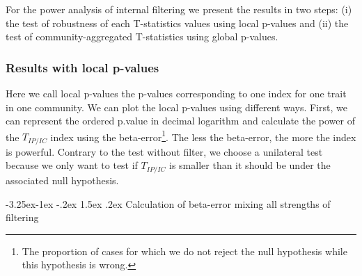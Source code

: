 \documentclass[12pt]{article}\usepackage[]{graphicx}\usepackage[]{color}
\makeatletter
\newcounter {subsubsubsection}[subsubsection]
\newcommand\subsubsubsection{\@startsection{subsubsubsection}{4}{\z@}%
          {-3.25ex\@plus -1ex \@minus -.2ex}%
          {1.5ex \@plus .2ex}%
          {\normalfont\normalsize\bfseries}}
\makeatother
\begin{document}
For the power analysis of internal filtering we present the results in two steps: (i) the test of robustness of each T-statistics values using local p-values and (ii) the test of community-aggregated T-statistics using global p-values.

 \subsubsection {Results with local p-values}

Here we call local p-values the p-values corresponding to one index for one trait in one community. We can plot the local p-values using different ways. First, we can represent the ordered p.value in decimal logarithm and calculate the power of the $T_{IP/IC}$ index using the beta-error\footnote{The proportion of cases for which we do not reject the null hypothesis while this hypothesis is wrong.}. The less the beta-error, the more the index is powerful. Contrary to the test without filter, we choose a unilateral test because we only want to test if $T_{IP/IC}$ is smaller than it should be under the associated null hypothesis.


  \subsubsubsection {Calculation of beta-error mixing all strengths of filtering}
 
\end{document}

